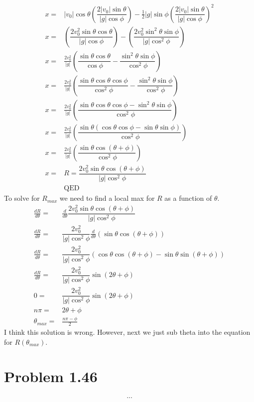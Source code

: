 \documentclass[12pt, a4paper]{article}
\begin{document}
\begin{align*}
x =& |v_0|\cos\theta \left(\dfrac{2|v_0|\sin\theta}{|g|\cos\phi}\right) - \tfrac{1}{2}|g|\sin\phi \left(\dfrac{2|v_0|\sin\theta}{|g|\cos\phi}\right)^2
\\
x =&  \left(\dfrac{2v_0^2\sin\theta\cos\theta}{|g|\cos\phi}\right) -  \left(\dfrac{2v_0^2\sin^2\theta\sin\phi}{|g|\cos^2\phi}\right)
\\
x =&  \frac{2v_0^2}{|g|}\left(\dfrac{\sin\theta\cos\theta}{\cos\phi} -  \dfrac{\sin^2\theta\sin\phi}{\cos^2\phi}\right)
\\
x =&  \frac{2v_0^2}{|g|}\left(
\dfrac{\sin\theta\cos\theta\cos\phi}{\cos^2\phi} -  
\dfrac{\sin^2\theta\sin\phi}{\cos^2\phi}
\right)
\\
x =&  \frac{2v_0^2}{|g|}\left(
\dfrac{\sin\theta\cos\theta\cos\phi - \sin^2\theta\sin\phi}{\cos^2\phi}
\right)
\\
x =&  \frac{2v_0^2}{|g|}\left(
\dfrac{\sin\theta(\cos\theta\cos\phi - \sin\theta\sin\phi)}{\cos^2\phi}
\right)
\\
x =&  \frac{2v_0^2}{|g|}\left(
\dfrac{\sin\theta\cos(\theta+\phi)}{\cos^2\phi}
\right)
\\
x =& \boxed{R = \dfrac{2v_0^2\sin\theta\cos(\theta+\phi)}{|g|\cos^2\phi}}
\\
&\text{QED}
\end{align*}
To solve for $R_{max}$ we need to find a local max for $R$ as a function of $\theta$.
\begin{align*}
\frac{dR}{d\theta} =& \frac{d}{d\theta}\dfrac{2v_0^2\sin\theta\cos(\theta+\phi)}{|g|\cos^2\phi}
\\
\frac{dR}{d\theta} =& \dfrac{2v_0^2}{|g|\cos^2\phi}\frac{d}{d\theta}\left(\sin\theta\cos(\theta+\phi)\right)
\\
\frac{dR}{d\theta} =& \dfrac{2v_0^2}{|g|\cos^2\phi}\left(
\cos\theta\cos(\theta+\phi) -
\sin\theta\sin(\theta+\phi)
\right)
\\
\frac{dR}{d\theta} =& \dfrac{2v_0^2}{|g|\cos^2\phi}\sin(2\theta+\phi)
\\
0 =& \dfrac{2v_0^2}{|g|\cos^2\phi}\sin(2\theta+\phi)
\\
n\pi =& 2\theta+\phi
\\
\theta_{max} =& \frac{n\pi-\phi}{2}
\end{align*}
I think this solution is wrong. However, next we just sub theta into the equation for $R(\theta_{max})$.





\pagebreak
\section*{Problem 1.46}
\begin{align*}
...
\end{align*}
\end{document}
